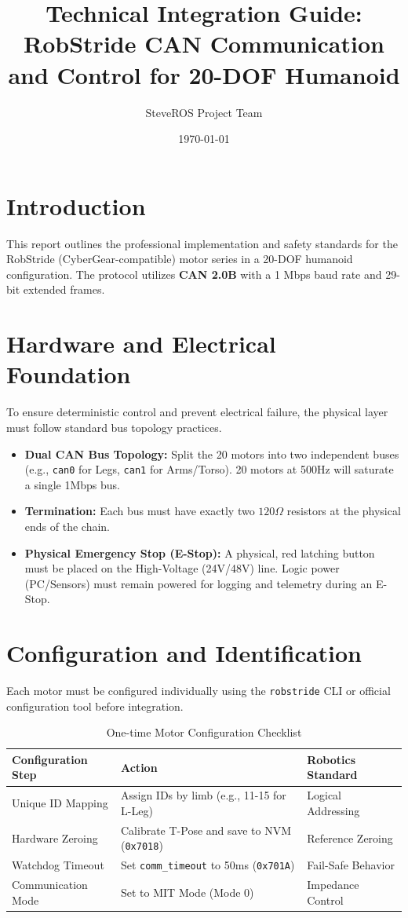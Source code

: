 \documentclass[11pt,a4paper]{article}
\title{\textbf{Technical Integration Guide: RobStride CAN Communication and Control for 20-DOF Humanoid}}
\author{SteveROS Project Team}
\date{\today}
\begin{document}
\maketitle

\section{Introduction}
This report outlines the professional implementation and safety standards for the RobStride (CyberGear-compatible) motor series in a 20-DOF humanoid configuration. The protocol utilizes \textbf{CAN 2.0B} with a 1 Mbps baud rate and 29-bit extended frames.

\section{Hardware and Electrical Foundation}
To ensure deterministic control and prevent electrical failure, the physical layer must follow standard bus topology practices.

\begin{itemize}
    \item \textbf{Dual CAN Bus Topology:} Split the 20 motors into two independent buses (e.g., \texttt{can0} for Legs, \texttt{can1} for Arms/Torso). 20 motors at 500Hz will saturate a single 1Mbps bus.
    \item \textbf{Termination:} Each bus must have exactly two $120\Omega$ resistors at the physical ends of the chain.
    \item \textbf{Physical Emergency Stop (E-Stop):} A physical, red latching button must be placed on the High-Voltage (24V/48V) line. Logic power (PC/Sensors) must remain powered for logging and telemetry during an E-Stop.
\end{itemize}

\section{Configuration and Identification}
Each motor must be configured individually using the \texttt{robstride} CLI or official configuration tool before integration.

\begin{table}[h]
\centering
\begin{tabular}{@{}lll@{}}
\toprule
\textbf{Configuration Step} & \textbf{Action} & \textbf{Robotics Standard} \\ \midrule
Unique ID Mapping & Assign IDs by limb (e.g., 11-15 for L-Leg) & Logical Addressing \\
Hardware Zeroing & Calibrate T-Pose and save to NVM (\texttt{0x7018}) & Reference Zeroing \\
Watchdog Timeout & Set \texttt{comm\_timeout} to 50ms (\texttt{0x701A}) & Fail-Safe Behavior \\
Communication Mode & Set to MIT Mode (Mode 0) & Impedance Control \\ \bottomrule
\end{tabular}
\caption{One-time Motor Configuration Checklist}
\end{table}
\end{document}
